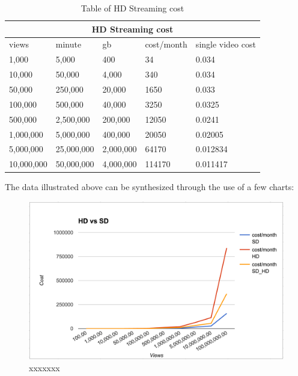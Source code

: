 \begin{table}
\centering 
\begin{tabular}{ |p{2cm}|p{2cm}|p{2cm}|p{2cm}|p{2cm}| }
  \hline
  \multicolumn{5}{|c|}{HD Streaming cost} \\
  \hline
  views & minute & gb & cost/month & single video cost\\
  \hline
1,000 & 5,000 & 400 & 34 & 0.034 \\
10,000 & 50,000 & 4,000 & 340 & 0.034\\
50,000 & 250,000 & 20,000 & 1650 & 0.033\\
100,000 & 500,000 & 40,000 & 3250 & 0.0325\\
500,000 & 2,500,000 & 200,000 & 12050 & 0.0241\\
1,000,000 & 5,000,000 & 400,000 & 20050 & 0.02005\\
5,000,000 & 25,000,000 & 2,000,000 & 64170 & 0.012834\\
10,000,000 & 50,000,000 & 4,000,000 & 114170 & 0.011417\\
  \hline
\end{tabular}
\caption{Table of HD Streaming cost}
\label{table:1}
\end{table}

The data illustrated above can be synthesized through the use of a few charts:

\begin{figure}[htb]
 \centering
 \includegraphics[width=1.0\linewidth]{images/chapter2/grafico.png}\hfill
 \caption[xxxxxxx]{xxxxxxx}
 \label{fig:fourV}
\end{figure}
